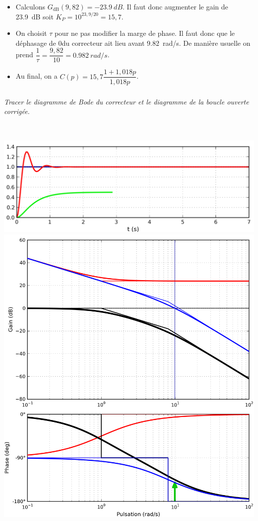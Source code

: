 \documentclass[10pt,fleqn]{article} %
\begin{document}
\begin{multicols}{2}
\begin{corrige}
\begin{itemize}
\item Calculons $G_{\text{dB}}(9,82)=\SI{-23,9}{dB}$. Il faut donc augmenter le gain de \SI{23,9}{dB} soit $K_P=10^{23,9/20}=15,7$.

\item On choisit $\tau$ pour ne pas modifier la marge de phase. Il faut donc que le déphasage de 0\degres du correcteur ait lieu  avant \SI{9,82}{rad/s}. De manière usuelle on prend $\dfrac{1}{\tau}=\dfrac{9,82}{10}=\SI{0,982}{rad/s}$.

\item Au final, on a $C(p)=15,7\dfrac{1+1,018p}{1,018p}$.
\end{itemize}

\end{corrige}
\else\fi

\subparagraph{}\textit{Tracer le diagramme de Bode du correcteur et le diagramme de la boucle ouverte corrigée.}

\ifprof
\begin{corrige}~\\
\begin{center}
\includegraphics[width=\linewidth]{images/PI_corrige.png}
\includegraphics[width=\linewidth]{images/PI_BodeC.png}
\end{center}
\end{corrige}
\else
\fi



\end{multicols}
\end{document}
